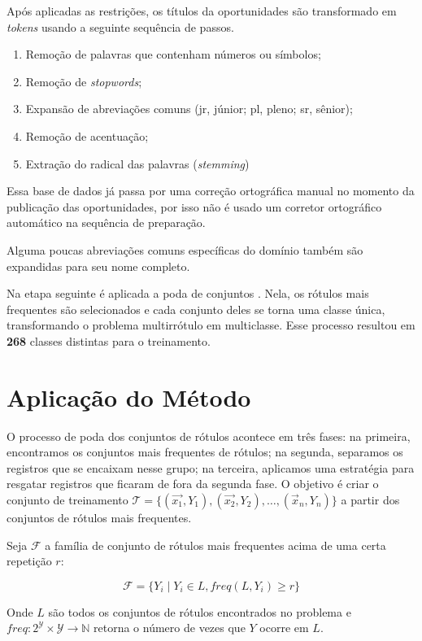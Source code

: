 \documentclass[runningheads,a4paper]{llncs}
\begin{document}
Após aplicadas as restrições, os títulos da oportunidades são transformado em \textit{tokens} usando a seguinte sequência de passos.

\begin{enumerate}
	\item Remoção de palavras que contenham números ou símbolos;
	\item Remoção de \textit{stopwords};
	\item Expansão de abreviações comuns (jr, júnior; pl, pleno; sr, sênior);
	\item Remoção de acentuação;
	\item Extração do radical das palavras (\textit{stemming})
\end{enumerate}

Essa base de dados já passa por uma correção ortográfica manual no momento da publicação das oportunidades, por isso não é usado um corretor ortográfico automático na sequência de preparação.

Alguma poucas abreviações comuns específicas do domínio também são expandidas para seu nome completo.

Na etapa seguinte é aplicada a poda de conjuntos \cite{Read2008-bt}. Nela, os rótulos mais frequentes são selecionados e cada conjunto deles se torna uma classe única, transformando o problema multirrótulo em multiclasse. Esse processo resultou em \textbf{268} classes distintas para o treinamento.

\section{Aplicação do Método} \label{sec:aplicacao}

O processo de poda dos conjuntos de rótulos acontece em três fases: na primeira, encontramos os conjuntos mais frequentes de rótulos; na segunda, separamos os registros que se encaixam nesse grupo; na terceira, aplicamos uma estratégia para resgatar registros que ficaram de fora da segunda fase. O objetivo é criar o conjunto de treinamento $\mathcal{T} = \{(\vec{x_1},Y_1), (\vec{x_2}, Y_2), \dots, (\vec{x}_n, Y_n)\}$ a partir dos conjuntos de rótulos mais frequentes.

Seja $\mathcal{F}$ a família de conjunto de rótulos mais frequentes acima de uma certa repetição $r$:

$$
\mathcal{F} = \{Y_i \mid Y_i \in L, freq(L, Y_i) \geq r\}
$$

Onde $L$ são todos os conjuntos de rótulos encontrados no problema e $freq : 2^\mathcal{Y} \times \mathcal{Y} \to \mathbb{N}$ retorna o número de vezes que $Y$ ocorre em $L$.
\end{document}
